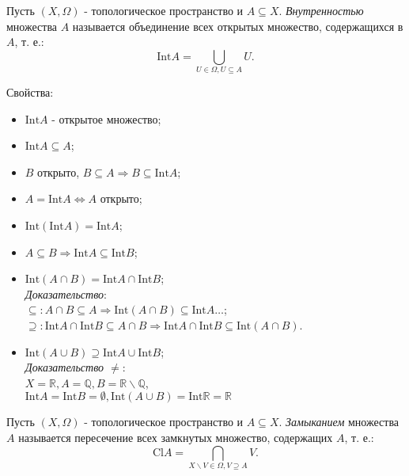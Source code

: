 \documentclass[a4paper,100pt]{article}
\theoremstyle{indented}
\begin{document}
Пусть $(X, \Omega)$ - топологическое пространство и $A\subseteq X$. \textit{Внутренностью} множества $A$ называется объединение всех открытых множество, содержащихся в $A$, т. е.:
\[
    \text{Int} A = \bigcup_{U\in \Omega, U\subseteq A} U.
\]

Свойства:
\begin{itemize}
    
    \item $\text{Int} A $ - открытое множество;
    \item $\text{Int} A \subseteq A$;
    \item $B$ открыто, $B\subseteq A \Rightarrow B\subseteq \text{Int} A$;
    \item $A = \text{Int}A \Leftrightarrow A$ открыто;
    \item $\text{Int}(\text{Int} A)=\text{Int}A$;
    \item $A \subseteq B \Rightarrow \text{Int} A \subseteq \text{Int} B$;
    \item $\text{Int}(A\cap B) = \text{Int}A\cap\text{Int}B$; \\ 
    \textit{Доказательство}:\\
    $\subseteq: A\cap B\subseteq A \Rightarrow \text{Int} (A\cap B)\subseteq \text{Int}A \dots$; \\
    $\supseteq: \text{Int}A\cap\text{Int} B \subseteq A\cap B \Rightarrow \text{Int}A\cap\text{Int}B \subseteq \text{Int}(A\cap B)$.
    \item $\text{Int}(A\cup B)\supseteq \text{Int}A\cup\text{Int}B$; \\
    \textit{Доказательство $\neq$}:\\
    $X = \mathbb{R}, A = \mathbb{Q}, B=\mathbb{R}\backslash \mathbb{Q}$, \\
    $\text{Int}A=\text{Int}B = \emptyset , \text{Int}(A\cup B) = \text{Int}\mathbb{R} = \mathbb{R}$


\end{itemize}

Пусть $(X, \Omega)$ - топологическое пространство и $A\subseteq X$. \textit{Замыканием} множества $A$ называется пересечение всех замкнутых множество, содержащих $A$, т. е.:
\[
    \text{Cl} A = \bigcap_{X\backslash V\in \Omega, V\supseteq A} V.
\]
\end{document}
